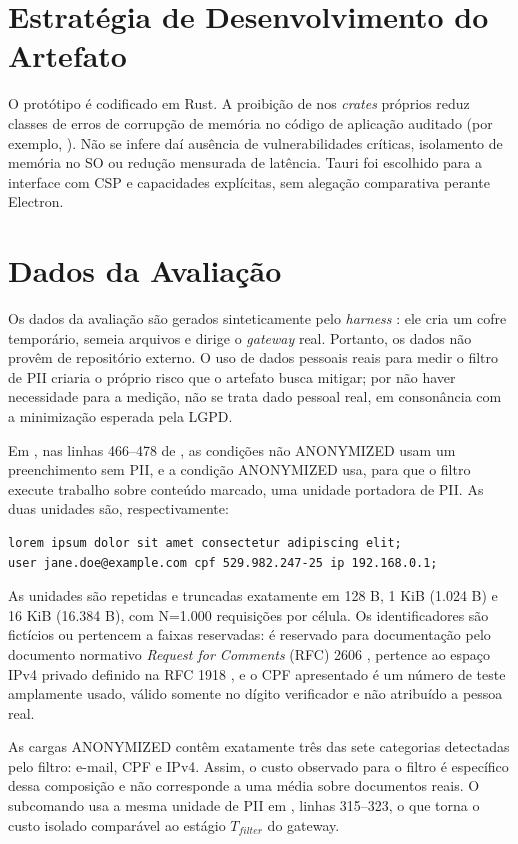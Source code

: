 \section{Estratégia de Desenvolvimento do Artefato}
O protótipo é codificado em Rust. A proibição de  nos \textit{crates} próprios reduz classes de erros de corrupção de memória no código de aplicação auditado (por exemplo, ). Não se infere daí ausência de vulnerabilidades críticas, isolamento de memória no SO ou redução mensurada de latência. Tauri foi escolhido para a interface com CSP e capacidades explícitas, sem alegação comparativa perante Electron.

\section{Dados da Avaliação}
\label{sec:dados-avaliacao}
Os dados da avaliação são gerados sinteticamente pelo \textit{harness} : ele cria um cofre temporário, semeia arquivos e dirige o \textit{gateway} real. Portanto, os dados não provêm de repositório externo. O uso de dados pessoais reais para medir o filtro de PII criaria o próprio risco que o artefato busca mitigar; por não haver necessidade para a medição, não se trata dado pessoal real, em consonância com a minimização esperada pela LGPD.

Em , nas linhas 466--478 de , as condições não ANONYMIZED usam um preenchimento sem PII, e a condição ANONYMIZED usa, para que o filtro execute trabalho sobre conteúdo marcado, uma unidade portadora de PII. As duas unidades são, respectivamente:
\begingroup
\footnotesize
\begin{verbatim}
lorem ipsum dolor sit amet consectetur adipiscing elit;
user jane.doe@example.com cpf 529.982.247-25 ip 192.168.0.1;
\end{verbatim}
\endgroup
As unidades são repetidas e truncadas exatamente em 128 B, 1 KiB (1.024 B) e 16 KiB (16.384 B), com N=1.000 requisições por célula. Os identificadores são fictícios ou pertencem a faixas reservadas:  é reservado para documentação pelo documento normativo \textit{Request for Comments} (RFC) 2606 \cite{rfc2606},  pertence ao espaço IPv4 privado definido na RFC 1918 \cite{rfc1918}, e o CPF apresentado é um número de teste amplamente usado, válido somente no dígito verificador e não atribuído a pessoa real.

As cargas ANONYMIZED contêm exatamente três das sete categorias detectadas pelo filtro: e-mail, CPF e IPv4. Assim, o custo observado para o filtro é específico dessa composição e não corresponde a uma média sobre documentos reais. O subcomando  usa a mesma unidade de PII em , linhas 315--323, o que torna o custo isolado comparável ao estágio $T_{filter}$ do gateway.

